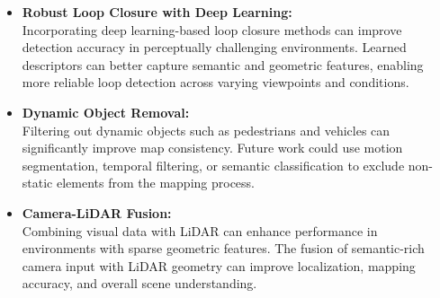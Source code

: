 	\begin{itemize}
		\item \textbf{Robust Loop Closure with Deep Learning:} \\
		Incorporating deep learning-based loop closure methods can improve detection accuracy in perceptually challenging environments. Learned descriptors can better capture semantic and geometric features, enabling more reliable loop detection across varying viewpoints and conditions.
		
		\item \textbf{Dynamic Object Removal:} \\
		Filtering out dynamic objects such as pedestrians and vehicles can significantly improve map consistency. Future work could use motion segmentation, temporal filtering, or semantic classification to exclude non-static elements from the mapping process.
		
		\item \textbf{Camera-LiDAR Fusion:} \\
		Combining visual data with LiDAR can enhance performance in environments with sparse geometric features. The fusion of semantic-rich camera input with LiDAR geometry can improve localization, mapping accuracy, and overall scene understanding.
		
	\end{itemize}